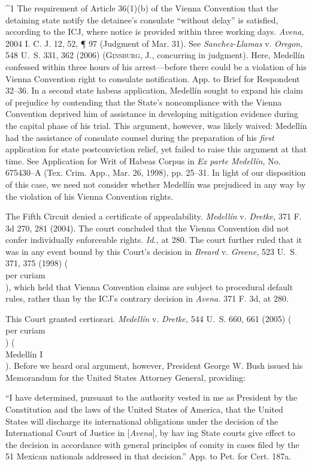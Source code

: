 {{^1 The requirement of Article 36(1)(b) of the Vienna Convention that the
detaining state notify the detainee's consulate ``without delay''
is satisfied, according to the ICJ, where notice is provided within
three working days. \emph{Avena,} 2004 I. C. J. 12, 52, ¶ 97 (Judgment
of Mar. 31). See \emph{Sanchez-Llamas} v. \emph{Oregon,} 548 U.~S. 331, 362
(2006) (\textsc{Ginsburg,} J., concurring in judgment). Here, Medellín
confessed within three hours of his arrest---before there could be a
violation of his Vienna Convention right to consulate notification. App.
to Brief for Respondent 32--36. In a second state habeas application,
Medellín sought to expand his claim of prejudice by contending that
the State's noncompliance with the Vienna Convention deprived him of
assistance in developing mitigation evidence during the capital phase of
his trial. This argument, however, was likely waived: Medellín had the
assistance of consulate counsel during the preparation of his \emph{first}
application for state postconviction relief, yet failed to raise this
argument at that time. See Application for Writ of Habeas Corpus in
\emph{Ex parte Medellín,} No. 675430--A (Tex. Crim. App., Mar. 26, 1998),
pp. 25--31. In light of our disposition of this case, we need not
consider whether Medellín was prejudiced in any way by the violation of
his Vienna Convention rights.

  The Fifth Circuit denied a certificate of appealability.
\emph{Medellín} v. \emph{Dretke,} 371 F. 3d 270, 281 (2004). The court
concluded that the Vienna Convention did not confer individually
enforceable rights. \emph{Id.,} at 280. The court further ruled that it
was in any event bound by this Court's decision in \emph{Breard} v.
\emph{Greene,} 523 U.~S. 371, 375 (1998) (\\per curiam\\), which held
that Vienna Convention claims are subject to procedural default rules,
rather than by the ICJ's contrary decision in \emph{Avena.} 371 F. 3d,
at 280.

  This Court granted certiorari. \emph{Medellín} v. \emph{Dretke,} 544
U.~S. 660, 661 (2005) (\\per curiam\\) (\\Medellín I\\). Before
we heard oral argument, however, President George W. Bush issued his
Memorandum for the United States Attorney General, providing:

    ``I have determined, pursuant to the authority vested in me as
    President by the Constitution and the laws of the United States of
    America, that the United States will discharge its international
    obligations under the decision of the International Court of Justice
    in [\emph{Avena}], by hav ing State courts give effect to the decision
    in accordance with general principles of comity in cases filed by
    the 51 Mexican nationals addressed in that decision.'' App. to
    Pet. for Cert. 187a.

}}
